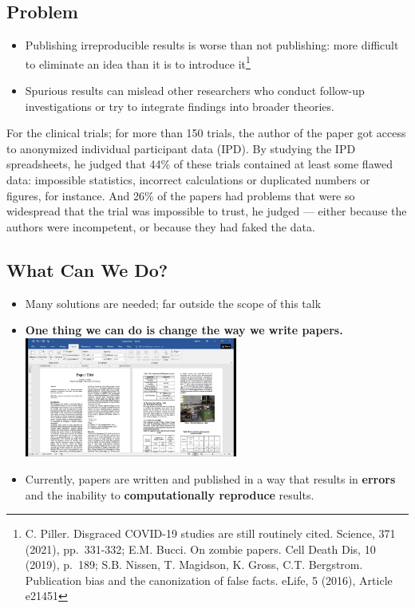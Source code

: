 \documentclass[
  letterpaper,
  DIV=11,
  numbers=noendperiod]{scrartcl}
\begin{document}
\subsection{Problem}\label{problem-6}

\begin{itemize}
\item
  Publishing irreproducible results is worse than not publishing: more
  difficult to eliminate an idea than it is to introduce it\footnote{C.
    Piller. Disgraced COVID-19 studies are still routinely cited.
    Science, 371 (2021), pp.~331-332; E.M. Bucci. On zombie papers. Cell
    Death Dis, 10 (2019), p.~189; S.B. Nissen, T. Magidson, K. Gross,
    C.T. Bergstrom. Publication bias and the canonization of false
    facts. eLife, 5 (2016), Article e21451}
\item
  Spurious results can mislead other researchers who conduct follow-up
  investigations or try to integrate findings into broader theories.
\end{itemize}

For the clinical trials; for more than 150 trials, the author of the
paper got access to anonymized individual participant data (IPD). By
studying the IPD spreadsheets, he judged that 44\% of these trials
contained at least some flawed data: impossible statistics, incorrect
calculations or duplicated numbers or figures, for instance. And 26\% of
the papers had problems that were so widespread that the trial was
impossible to trust, he judged --- either because the authors were
incompetent, or because they had faked the data.

\subsection{What Can We Do?}\label{what-can-we-do}

\begin{itemize}
\item
  Many solutions are needed; far outside the scope of this talk
\item
  \textbf{One thing we can do is change the way we write papers.}
  \includegraphics[width=0.55\textwidth,height=0.55\textheight]{img/worddoc.png}
\item
  Currently, papers are written and published in a way that results in
  \textbf{errors} and the inability to \textbf{computationally
  reproduce} results.
\end{itemize}
\end{document}
